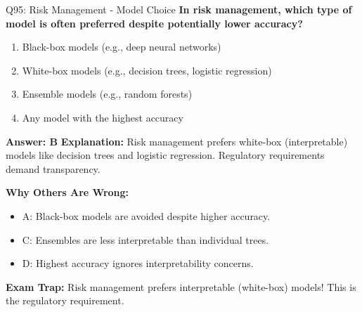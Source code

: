\documentclass[8pt]{beamer}
\begin{document}
	\begin{frame}{Q95: Risk Management - Model Choice}
		\fontsize{6.5}{7.5}\selectfont
		\textbf{In risk management, which type of model is often preferred despite potentially lower accuracy?}
		
		\begin{enumerate}
			\item Black-box models (e.g., deep neural networks)
			\item White-box models (e.g., decision trees, logistic regression)
			\item Ensemble models (e.g., random forests)
			\item Any model with the highest accuracy
		\end{enumerate}
		
		\vspace{0.05cm}
		\textcolor{myblue}{\textbf{Answer: B}}
		\vspace{0.05cm}
		\textcolor{myblue}{\textbf{Explanation:}} Risk management prefers white-box (interpretable) models like decision trees and logistic regression. Regulatory requirements demand transparency.
		
		\vspace{0.05cm}
		\textcolor{myred}{\textbf{Why Others Are Wrong:}}
		\begin{itemize}
			\item \textcolor{myred}{A:} Black-box models are avoided despite higher accuracy.
			\item \textcolor{myred}{C:} Ensembles are less interpretable than individual trees.
			\item \textcolor{myred}{D:} Highest accuracy ignores interpretability concerns.
		\end{itemize}
		
		\textcolor{myred}{\textbf{Exam Trap:}} Risk management prefers \textcolor{myblue}{interpretable (white-box)} models! This is the regulatory requirement.
	\end{frame}
	
\end{document}
